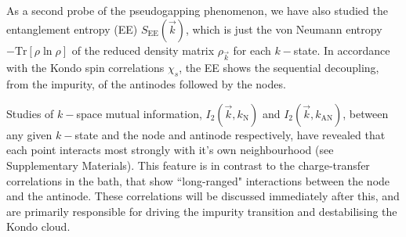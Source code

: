 \documentclass[reprint,hidelinks]{revtex4-2}
\begin{document}
As a second probe of the pseudogapping phenomenon, we have also studied the entanglement entropy (EE) \(S_\text{EE}(\vec k)\), which is just the von Neumann entropy \(-\text{Tr}\left[\rho \ln \rho\right] \) of the reduced density matrix \(\rho_{\vec k}\) for each \(k-\)state. In accordance with the Kondo spin correlations \(\chi_s\), the EE shows the sequential decoupling, from the impurity, of the antinodes followed by the nodes. 

Studies of \(k-\)space mutual information, \(I_2(\vec k, k_\text{N})\) and \(I_2(\vec k, k_\text{AN})\), between any given \(k-\)state and the node and antinode respectively, have revealed that each point interacts most strongly with it's own neighbourhood (see Supplementary Materials). This feature is in contrast to the charge-transfer correlations in the bath, that show ``long-ranged" interactions between the node and the antinode. These correlations will be discussed immediately after this, and are primarily responsible for driving the impurity transition and destabilising the Kondo cloud.
\end{document}
